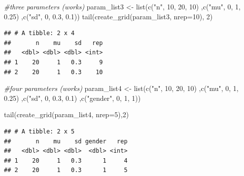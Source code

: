 \documentclass[11pt,a4paper]{article}
\newenvironment{Shaded}{\begin{snugshade}}{\end{snugshade}}
\newcommand{\AttributeTok}[1]{\textcolor[rgb]{0.77,0.63,0.00}{#1}}
\newcommand{\CommentTok}[1]{\textcolor[rgb]{0.56,0.35,0.01}{\textit{#1}}}
\newcommand{\DecValTok}[1]{\textcolor[rgb]{0.00,0.00,0.81}{#1}}
\newcommand{\FloatTok}[1]{\textcolor[rgb]{0.00,0.00,0.81}{#1}}
\newcommand{\FunctionTok}[1]{\textcolor[rgb]{0.00,0.00,0.00}{#1}}
\newcommand{\NormalTok}[1]{#1}
\newcommand{\OtherTok}[1]{\textcolor[rgb]{0.56,0.35,0.01}{#1}}
\newcommand{\StringTok}[1]{\textcolor[rgb]{0.31,0.60,0.02}{#1}}
\begin{document}
\begin{Shaded}
\begin{Highlighting}[]
\CommentTok{\#three parameters (works)}
\NormalTok{param\_list3 }\OtherTok{\textless{}{-}} \FunctionTok{list}\NormalTok{(}\FunctionTok{c}\NormalTok{(}\StringTok{"n"}\NormalTok{, }\DecValTok{10}\NormalTok{, }\DecValTok{20}\NormalTok{, }\DecValTok{10}\NormalTok{)}
\NormalTok{                    ,}\FunctionTok{c}\NormalTok{(}\StringTok{"mu"}\NormalTok{, }\DecValTok{0}\NormalTok{, }\DecValTok{1}\NormalTok{, }\FloatTok{0.25}\NormalTok{)}
\NormalTok{                    ,}\FunctionTok{c}\NormalTok{(}\StringTok{"sd"}\NormalTok{, }\DecValTok{0}\NormalTok{, }\FloatTok{0.3}\NormalTok{, }\FloatTok{0.1}\NormalTok{))}
\FunctionTok{tail}\NormalTok{(}\FunctionTok{create\_grid}\NormalTok{(param\_list3, }\AttributeTok{nrep=}\DecValTok{10}\NormalTok{), }\DecValTok{2}\NormalTok{)}
\end{Highlighting}
\end{Shaded}

\begin{verbatim}
## # A tibble: 2 x 4
##       n    mu    sd   rep
##   <dbl> <dbl> <dbl> <int>
## 1    20     1   0.3     9
## 2    20     1   0.3    10
\end{verbatim}

\begin{Shaded}
\begin{Highlighting}[]
\CommentTok{\#four parameters (works)}
\NormalTok{param\_list4 }\OtherTok{\textless{}{-}} \FunctionTok{list}\NormalTok{(}\FunctionTok{c}\NormalTok{(}\StringTok{"n"}\NormalTok{, }\DecValTok{10}\NormalTok{, }\DecValTok{20}\NormalTok{, }\DecValTok{10}\NormalTok{)}
\NormalTok{                    ,}\FunctionTok{c}\NormalTok{(}\StringTok{"mu"}\NormalTok{, }\DecValTok{0}\NormalTok{, }\DecValTok{1}\NormalTok{, }\FloatTok{0.25}\NormalTok{)}
\NormalTok{                    ,}\FunctionTok{c}\NormalTok{(}\StringTok{"sd"}\NormalTok{, }\DecValTok{0}\NormalTok{, }\FloatTok{0.3}\NormalTok{, }\FloatTok{0.1}\NormalTok{)}
\NormalTok{                    ,}\FunctionTok{c}\NormalTok{(}\StringTok{"gender"}\NormalTok{, }\DecValTok{0}\NormalTok{, }\DecValTok{1}\NormalTok{, }\DecValTok{1}\NormalTok{))}

\FunctionTok{tail}\NormalTok{(}\FunctionTok{create\_grid}\NormalTok{(param\_list4, }\AttributeTok{nrep=}\DecValTok{5}\NormalTok{),}\DecValTok{2}\NormalTok{)}
\end{Highlighting}
\end{Shaded}

\begin{verbatim}
## # A tibble: 2 x 5
##       n    mu    sd gender   rep
##   <dbl> <dbl> <dbl>  <dbl> <int>
## 1    20     1   0.3      1     4
## 2    20     1   0.3      1     5
\end{verbatim}
\end{document}
